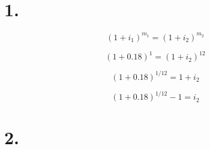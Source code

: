 \documentclass{article}
\begin{document}
\section*{1.}

\[ (1 + i_1)^{m_1} =  (1 + i_2)^{m_2} \]

\[ (1 + 0.18)^{1} =  (1 + i_2)^{12} \]

\[ (1 + 0.18)^{1/12} =  1 + i_2 \]

\[ (1 + 0.18)^{1/12} - 1 = i_2 \]

\section*{2.}
\end{document}
